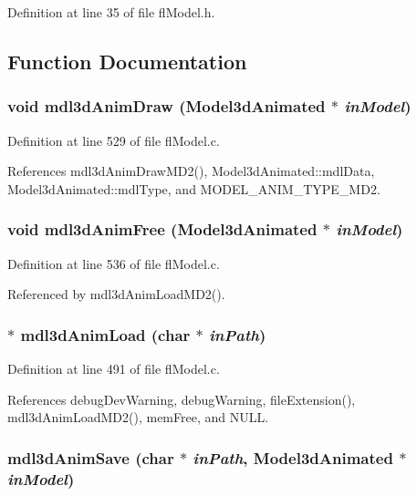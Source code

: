 Definition at line 35 of file fl\-Model.h.

\subsection{Function Documentation}
\subsubsection{\setlength{\rightskip}{0pt plus 5cm}void mdl3d\-Anim\-Draw ({\bf Model3d\-Animated} $\ast$ {\em in\-Model})}\label{flModel_8h_fda07d8b0fa108ae3b3a53fb02179f9e}




Definition at line 529 of file fl\-Model.c.

References mdl3d\-Anim\-Draw\-MD2(), Model3d\-Animated::mdl\-Data, Model3d\-Animated::mdl\-Type, and MODEL\_\-ANIM\_\-TYPE\_\-MD2.
\subsubsection{\setlength{\rightskip}{0pt plus 5cm}void mdl3d\-Anim\-Free ({\bf Model3d\-Animated} $\ast$ {\em in\-Model})}\label{flModel_8h_505d5a999b50546385c81e59ed9a16c8}




Definition at line 536 of file fl\-Model.c.

Referenced by mdl3d\-Anim\-Load\-MD2().
\subsubsection{$\ast$ mdl3d\-Anim\-Load (char $\ast$ {\em in\-Path})}\label{flModel_8h_473ee9490cf7380372e04daf1289587f}




Definition at line 491 of file fl\-Model.c.

References debug\-Dev\-Warning, debug\-Warning, file\-Extension(), mdl3d\-Anim\-Load\-MD2(), mem\-Free, and NULL.
\subsubsection{ mdl3d\-Anim\-Save (char $\ast$ {\em in\-Path}, {\bf Model3d\-Animated} $\ast$ {\em in\-Model})}\label{flModel_8h_ea4bbb9d2e21e14e66b277b5a94f6285}




